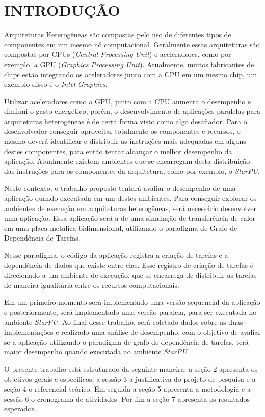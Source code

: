 
\chapter{INTRODUÇÃO}
\label{chap:introducao}

Arquiteturas Heterogêneas são compostas pelo uso de diferentes tipos de componentes em um mesmo nó computacional.
Geralmente essas arquiteturas são compostas por CPUs (\textit{Central Processing Unit}) e aceleradores, como por exemplo, a GPU (\textit{Graphics Processing Unit}).
Atualmente, muitos fabricantes de chips estão integrando os aceleradores junto com a CPU em um mesmo chip, um exemplo disso é o \textit{Intel Graphics}. 

Utilizar aceleradores como a GPU, junto com a CPU aumenta o desempenho e diminui o gasto energético, porém,
o desenvolvimento de aplicações paralelas para arquiteturas heterogêneas é de certa forma visto como algo desafiador.
Para o desenvolvedor conseguir aproveitar totalmente os componentes e recursos, o mesmo deverá identificar e distribuir as instruções mais adequadas em alguns destes componentes,
para então tentar alcançar o melhor desempenho da aplicação.
Atualmente existem ambientes que se encarregam desta distribuição das instruções para os componentes da arquitetura, como por exemplo, o \textit{StarPU}.

Neste contexto, o trabalho proposto tentará avaliar o desempenho de uma aplicação quando executada em um destes ambientes.
Para conseguir explorar os ambientes de execução em arquiteturas heterogêneas, será necessário desenvolver uma aplicação.
Essa aplicação será a de uma simulação de transferência de calor em uma placa metálica bidimensional, utilizando o paradigma de Grafo de Dependência de Tarefas. 

Nesse paradigma, o código da aplicação registra a criação de tarefas e a dependência de dados que existe entre elas.
Esse registro de criação de tarefas é direcionado a um ambiente de execução, que se encarrega de distribuir as tarefas de maneira igualitária entre os recursos computacionais.

Em um primeiro momento será implementado uma versão sequencial da aplicação e posteriormente, será implementado uma versão paralela, para ser executada no ambiente \textit{StarPU}.
Ao final desse trabalho, será coletado dados sobre as duas implementações e realizado uma análise de desempenho,
com o objetivo de avaliar se a aplicação utilizando o paradigma de grafo de dependência de tarefas, terá maior desempenho quando executada no ambiente \textit{StarPU}. 

O presente trabalho está estruturado da seguinte maneira: a seção 2 apresenta os objetivos gerais e específicos, a sessão 3 a justificativa do projeto de pesquisa e a seção 4 o referencial teórico.
Em seguida a seção 5 apresenta a metodologia e a sessão 6 o cronograma de atividades.
Por fim a seção 7 apresenta os resultados esperados.